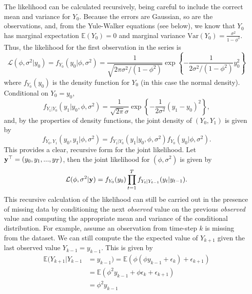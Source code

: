 The likelihood can be calculated recursively, being careful to include the correct mean and variance for $Y_0$. Because the errors are Gaussian, so are the observations, and, from the Yule-Walker equations (see below), we know that $Y_0$ has marginal expectation $\mathbb{E}(Y_0) = 0$ and marginal variance $\text{Var}(Y_0) = \frac{\sigma^2}{1 - \phi^2}$. Thus, the likelihood for the first observation in the series is 
\begin{equation*}
    \mathcal{L}(\phi, \sigma^2 | y_0) = f_{Y_0}(y_0 | \phi, \sigma^2) =  \frac{1}{\sqrt{2\pi \sigma^2/(1 - \phi^2) }} \exp\left\{-\frac{1}{2\sigma^2/(1-\phi^2)}y_0^2 \right\}
\end{equation*}
where $f_{Y_0}(y_0)$ is the density function for $Y_0$ (in this case the normal density). Conditional on $Y_0 = y_0$, 
\begin{equation*}
    f_{Y_1|Y_0}(y_1 | y_0, \phi, \sigma^2) = \frac{1}{\sqrt{2\pi}\sigma} \exp \left\{- \frac{1}{2\sigma^2}(y_1 - y_0)^2\right\},
\end{equation*}
and, by the properties of density functions, the joint density of $(Y_0, Y_1)$ is given by
\begin{equation*}
    f_{Y_0,Y_1}(y_0,y_1|\phi, \sigma^2) = f_{Y_1|Y_0}(y_1|y_0, \phi, \sigma^2) f_{Y_0}(y_0|\phi, \sigma^2).
\end{equation*}
This provides a clear, recursive form for the joint likelihood. Let ${\bf y}^\top = (y_0, y_1, ..., y_T)$, then the joint likelihood for $(\phi, \sigma^2)$ is given by
\begin{equation*}
    \mathcal{L}(\phi, \sigma^2| {\bf y}) = f_{Y_0}(y_0) \prod_{t = 1}^T f_{Y_{t}|Y_{t-1}}(y_t|y_{t-1}).
\end{equation*}
This recursive calculation of the likelihood can still be carried out in the presence of missing data by conditioning the next \textit{observed} value on the previous \textit{observed} value and computing the appropriate mean and variance of the conditional distribution. For example, assume an observation from time-step $k$ is missing from the dataset. We can still compute the the expected value of $Y_{k+1}$ given the last observed value $Y_{k-1} = y_{k-1}$. This is given by
\begin{equation*}
  \begin{aligned}
      \mathbb{E}(Y_{k+1}| Y_{k-1} &= y_{k-1}) = \mathbb{E}(\phi(\phi y_{k-1} + \epsilon_{k}) + \epsilon_{k+1})\\
      &= \mathbb{E}(\phi^2 y_{k-1} + \phi\epsilon_{k} + \epsilon_{k+1})\\
      &= \phi^2 y_{k-1}
  \end{aligned}
\end{equation*}

